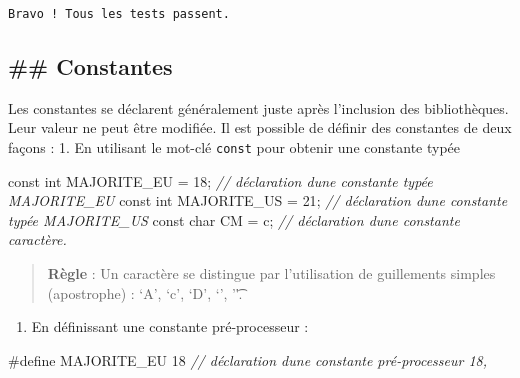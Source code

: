 \documentclass[11pt]{article}
\providecommand{\tightlist}{%
      \setlength{\itemsep}{0pt}\setlength{\parskip}{0pt}}
\newenvironment{Shaded}{}{}
\newcommand{\DataTypeTok}[1]{\textcolor[rgb]{0.56,0.13,0.00}{{#1}}}
\newcommand{\DecValTok}[1]{\textcolor[rgb]{0.25,0.63,0.44}{{#1}}}
\newcommand{\CharTok}[1]{\textcolor[rgb]{0.25,0.44,0.63}{{#1}}}
\newcommand{\CommentTok}[1]{\textcolor[rgb]{0.38,0.63,0.69}{\textit{{#1}}}}
\newcommand{\NormalTok}[1]{{#1}}
\newcommand{\PreprocessorTok}[1]{\textcolor[rgb]{0.74,0.48,0.00}{{#1}}}
\begin{document}
    \begin{Verbatim}[commandchars=\\\{\}]
Bravo ! Tous les tests passent.
    \end{Verbatim}

    \hypertarget{constantes}{%
\subsection{\#\# Constantes}\label{constantes}}

    Les constantes se déclarent généralement juste après l'inclusion des
bibliothèques. Leur valeur ne peut être modifiée. Il est possible de
définir des constantes de deux façons : 1. En utilisant le mot-clé
\texttt{const} pour obtenir une constante typée

\begin{Shaded}
\begin{Highlighting}[]
    \DataTypeTok{const} \DataTypeTok{int}\NormalTok{ MAJORITE\_EU = }\DecValTok{18}\NormalTok{; }\CommentTok{// déclaration d\textquotesingle{}une constante typée MAJORITE\_EU }
    \DataTypeTok{const} \DataTypeTok{int}\NormalTok{ MAJORITE\_US = }\DecValTok{21}\NormalTok{; }\CommentTok{// déclaration d\textquotesingle{}une constante typée MAJORITE\_US }
    \DataTypeTok{const} \DataTypeTok{char}\NormalTok{ CM = }\CharTok{\textquotesingle{}c\textquotesingle{}}\NormalTok{; }\CommentTok{// déclaration d\textquotesingle{}une constante caractère. }
\end{Highlighting}
\end{Shaded}

\begin{quote}
\textbf{Règle} : Un caractère se distingue par l'utilisation de
guillements simples (apostrophe) : `A', `c', `D', `\n', '\t'.
\end{quote}

\begin{enumerate}
\def\labelenumi{\arabic{enumi}.}
\setcounter{enumi}{1}
\tightlist
\item
  En définissant une constante pré-processeur :
\end{enumerate}

\begin{Shaded}
\begin{Highlighting}[]
    \PreprocessorTok{\#define MAJORITE\_EU 18 }\CommentTok{// déclaration d\textquotesingle{}une constante pré{-}processeur 18, }
\end{Highlighting}
\end{Shaded}
\end{document}
